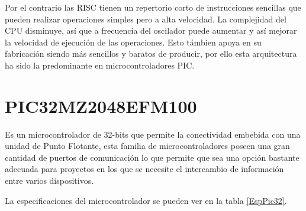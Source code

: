 \documentclass[letterpaper,12pt,oneside]{book}
\begin{document}
			Por el contrario las RISC tienen un repertorio corto de instrucciones sencillas que pueden realizar operaciones simples pero a alta velocidad. La complejidad del CPU disminuye, así que a frecuencia del oscilador puede aumentar y así mejorar la velocidad de ejecución de las operaciones. Esto támbien apoya en su fabricación siendo más sencillos y baratos de producir, por ello esta arquitectura ha sido la predominante en microcontroladores PIC.
		\section{PIC32MZ2048EFM100}
		Es un microcontrolador de 32-bits que permite la conectividad embebida con una unidad de Punto Flotante, esta familia de microcontroladores poseen una gran cantidad de puertos de comunicación lo que permite que sea una opción bastante adecuada para proyectos en los que se necesite el intercambio de información entre varios dispositivos.\cite{PIC32MZ}

		La especificaciones del microcontrolador se pueden ver en la tabla \ref{EspPic32}.

		\newpage
\end{document}

